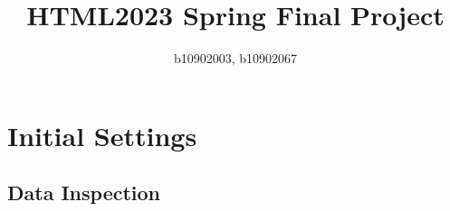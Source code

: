 \documentclass[10pt,letterpaper]{article}
\title{
		\usefont{OT1}{bch}{b}{n}
		\huge HTML2023 Spring Final Project \\
}
\author{b10902003, b10902067}
\begin{document}
\maketitle
\vspace{-0.5cm}






\section{Initial Settings}
\subsection{Data Inspection}

\end{document}
